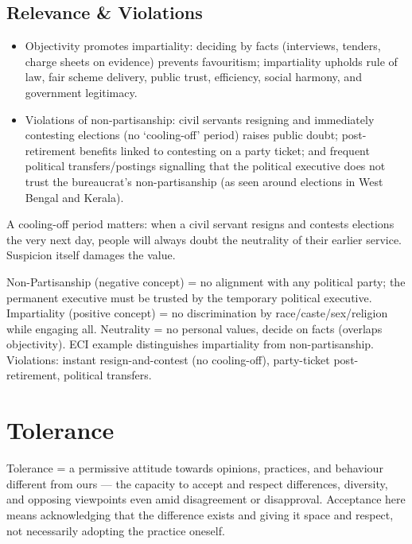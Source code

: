 \subsection{Relevance \& Violations}

\begin{itemize}
\item Objectivity promotes impartiality: deciding by facts (interviews, tenders, charge sheets on evidence) prevents favouritism; impartiality upholds rule of law, fair scheme delivery, public trust, efficiency, social harmony, and government legitimacy.
\item Violations of non-partisanship: civil servants resigning and immediately contesting elections (no `cooling-off' period) raises public doubt; post-retirement benefits linked to contesting on a party ticket; and frequent political transfers/postings signalling that the political executive does not trust the bureaucrat's non-partisanship (as seen around elections in West Bengal and Kerala).
\end{itemize}

\begin{CriticalPoint}
A cooling-off period matters: when a civil servant resigns and contests elections the very next day, people will always doubt the neutrality of their earlier service. Suspicion itself damages the value.
\end{CriticalPoint}

\begin{QuickRevision}
Non-Partisanship (negative concept) = no alignment with any political party; the permanent executive must be trusted by the temporary political executive. Impartiality (positive concept) = no discrimination by race/caste/sex/religion while engaging all. Neutrality = no personal values, decide on facts (overlaps objectivity). ECI example distinguishes impartiality from non-partisanship. Violations: instant resign-and-contest (no cooling-off), party-ticket post-retirement, political transfers.
\end{QuickRevision}

\section{Tolerance}

\begin{KeyConcept}
Tolerance = a permissive attitude towards opinions, practices, and behaviour different from ours --- the capacity to accept and respect differences, diversity, and opposing viewpoints even amid disagreement or disapproval. Acceptance here means acknowledging that the difference exists and giving it space and respect, not necessarily adopting the practice oneself.
\end{KeyConcept}

